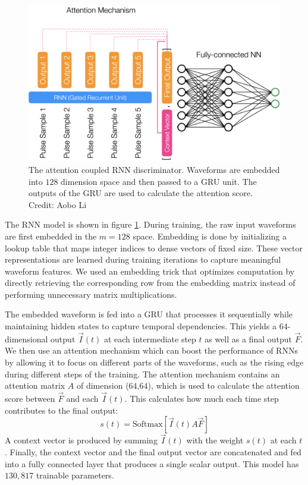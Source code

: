 \begin{figure}[htb!]
    \centering
    \includegraphics[width=0.8\linewidth,trim={0pc 0pc 0pc 0pc},clip]{ch6/figs/rnnAttention.png}
    \caption{The attention coupled RNN discriminator. Waveforms are embedded into $128$ dimension space and then passed to a GRU unit. The outputs of the GRU are used to calculate the attention score. Credit: Aobo Li}
    \label{ch6_fig_detail_network}
\end{figure}

The RNN model is shown in figure \ref{ch6_fig_detail_network}. During training, the raw input waveforms are first embedded in the $m=128$ space. Embedding is done by initializing a lookup table that maps integer indices to dense vectors of fixed size. These vector representations are learned during training iterations to capture meaningful waveform features. We used an embedding trick that optimizes computation by directly retrieving the corresponding row from the embedding matrix instead of performing unnecessary matrix multiplications. 

The embedded waveform is fed into a GRU that processes it sequentially while maintaining hidden states to capture temporal dependencies. This yields a $64$-dimensional output $\vec{I}(t)$ at each intermediate step $t$ as well as a final output $\vec{F}$. We then use an attention mechanism \cite{attention} which can boost the performance of RNNs by allowing it to focus on different parts of the waveforms, such as the rising edge during different steps of the training. The attention mechanism contains an attention matrix $A$ of dimension ($64$,$64$), which is used to calculate the attention score between $\vec{F}$ and each $\vec{I}(t)$. This calculates how much each time step contributes to the final output:
\begin{equation}
    s(t) = \mathrm{Softmax}[\vec{I}(t) A \vec{F}]
\end{equation}
A context vector is produced by summing $\vec{I}(t)$ with the weight $s(t)$ at each $t$. Finally, the context vector and the final output vector are concatenated and fed into a fully connected layer that produces a single scalar output. This model has $130,817$ trainable parameters.
